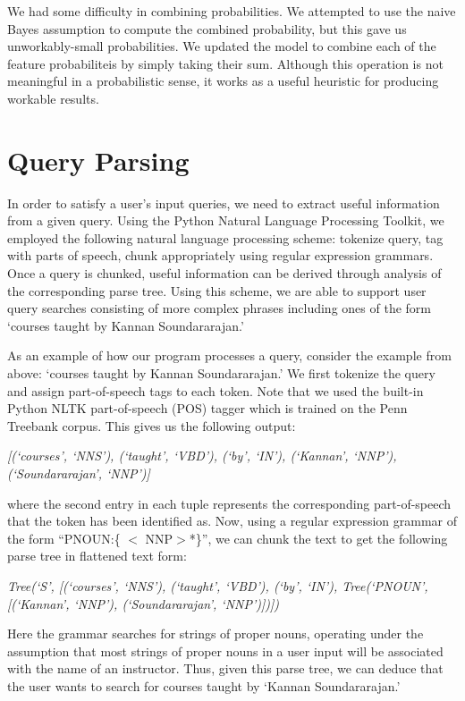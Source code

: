 \documentclass[12pt]{article}
\begin{document}
We had some difficulty in combining probabilities. We attempted to use
the naive Bayes assumption to compute the combined probability, but
this gave us unworkably-small probabilities. We updated the model to
combine each of the feature probabiliteis by simply taking their
sum. Although this operation is not meaningful in a probabilistic
sense, it works as a useful heuristic for producing workable results.

\section*{Query Parsing}
In order to satisfy a user's input queries, we need to extract useful
information from a given query. Using the Python Natural Language
Processing Toolkit, we employed the following natural language
processing scheme: tokenize query, tag with parts of speech, chunk
appropriately using regular expression grammars. Once a query is
chunked, useful information can be derived through analysis of the
corresponding parse tree. Using this scheme, we are able to support
user query searches consisting of more complex phrases including ones of the form 
`courses taught by Kannan Soundararajan.'

As an example of how our program processes a query, consider the
example from above: `courses taught by Kannan Soundararajan.' We first
tokenize the query and assign part-of-speech tags to each token. Note
that we used the built-in Python NLTK part-of-speech (POS) tagger
which is trained on the Penn Treebank corpus. This gives us the
following output: \vspace{0.15in}

\emph{\small{[(`courses', `NNS'), (`taught', `VBD'), (`by', `IN'), (`Kannan', `NNP'), (`Soundararajan', `NNP')]}}	 \vspace{0.15in}

\noindent where the second entry in each tuple represents the corresponding
part-of-speech that the token has been identified as. Now, using a
regular expression grammar of the form ``PNOUN:\{ $<$ NNP$>$*\}'', we
can chunk the text to get the following parse tree in flattened text
form: \vspace{0.15in}

\emph{\small{Tree(`S', [(`courses', `NNS'), (`taught', `VBD'), (`by', `IN'), Tree(`PNOUN', [(`Kannan', `NNP'), (`Soundararajan', `NNP')])])
}} \vspace{0.15in}

\noindent Here the grammar searches for strings of proper nouns, operating under the assumption that most strings of proper nouns in a user input will be associated with the name of an instructor. Thus, given this parse tree, we can deduce that the user wants to search for courses taught by `Kannan Soundararajan.'
\end{document}
